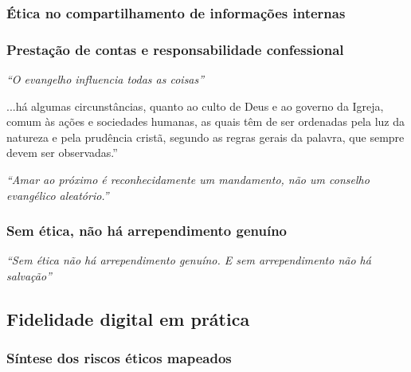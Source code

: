 \subsubsection{Ética no compartilhamento de informações internas}

\subsubsection{Prestação de contas e responsabilidade confessional}

\textit{“O evangelho influencia todas as coisas”} \cite[p. 56]{keller2014}

\begin{citacao}
...há algumas circunstâncias, quanto ao culto de Deus e ao governo da Igreja, comum às ações e sociedades humanas, as quais têm de ser ordenadas pela luz da natureza e pela prudência cristã, segundo as regras gerais da palavra, que sempre devem ser observadas.” \cite[Cap. I, § VI]{cfw}
\end{citacao}

\textit{“Amar ao próximo é reconhecidamente um mandamento, não um conselho evangélico aleatório.”} \cite[p. 745]{calvino2022}

\subsubsection{Sem ética, não há arrependimento genuíno}

\textit{“Sem ética não há arrependimento genuíno. E sem arrependimento não há salvação”} \cite[p. 102]{stott2008}

\subsection{Fidelidade digital em prática}

\subsubsection{Síntese dos riscos éticos mapeados}
